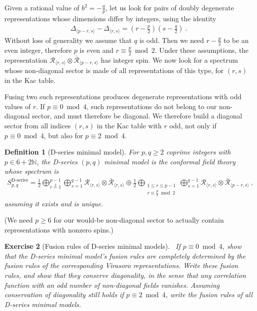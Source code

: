 \documentclass[12pt, a4paper]{article}
\theoremstyle{break}
\newtheorem{exo}{Exercise}[section]
\newtheorem{defn}[exo]{Definition}
\begin{document}
Given a rational value of $b^2=-\frac{q}{p}$, let us look for pairs of doubly degenerate representations whose dimensions differ by integers, using the identity
\begin{align}
 \Delta_{\langle p-r,s\rangle} -\Delta_{\langle r,s\rangle}= \left(r-\frac{p}{2}\right)\left(s-\frac{q}{2}\right)\ .
\end{align}
Without loss of generality we assume that $q$ is odd. Then we need $r-\frac{p}{2}$ to be an even integer, therefore $p$ is even and $r\equiv\frac{p}{2}\bmod 2$. Under these assumptions, the representation $\mathcal{R}_{\langle r,s\rangle}\otimes \bar{\mathcal{R}}_{\langle p-r,s\rangle}$ has integer spin. We now look for a spectrum whose non-diagonal sector is made of all representations of this type, for $(r,s)$ in the Kac table.

Fusing two such representations produces degenerate representations with odd values of $r$. If $p\equiv 0\bmod 4$, such representations do not belong to our non-diagonal sector, and must therefore be diagonal. We therefore build a diagonal sector from all indices $(r,s)$ in the Kac table with $r$ odd, not only if $p\equiv 0\bmod 4$, but also for $p\equiv 2\bmod 4$. 

\begin{defn}[D-series minimal model]
 For $p,q\geq 2$ coprime integers with $p\in 6+2\mathbb{N}$, the D-series $(p,q)$ minimal model is the conformal field theory whose spectrum is 
\begin{align}
 S_{p,q}^\text{D-series} = \frac12 \bigoplus_{r\overset{2}{=}1}^{p-1} \bigoplus_{s=1}^{q-1} \mathcal{R}_{ \langle r,s \rangle} \otimes \bar{\mathcal{R}}_{\langle r,s \rangle}\oplus \frac12\bigoplus_{\substack{1\leq r\leq p-1 \\ r\equiv \frac{p}{2}\bmod 2}} \bigoplus_{s=1}^{q-1} \mathcal{R}_{\langle r,s \rangle} \otimes \bar{\mathcal{R}}_{\langle p-r,s\rangle}\ ,
 \label{eq:sds}
\end{align}
assuming it exists and is unique.
\end{defn}
(We need $p\geq 6$ for our would-be non-diagonal sector to actually contain representations with nonzero spins.)

\begin{exo}[Fusion rules of D-series minimal models]
~\label{exo:frd}
 If $p\equiv 0\bmod 4$, show that the D-series minimal model's fusion rules are completely determined by the fusion rules of the corresponding Virasoro representations. Write these fusion rules, and show that they conserve diagonality, in the sense that any correlation function with an odd number of non-diagonal fields vanishes. Assuming conservation of diagonality still holds if $p\equiv 2\bmod 4$, write the fusion rules of all D-series minimal models.
\end{exo}
\end{document}
